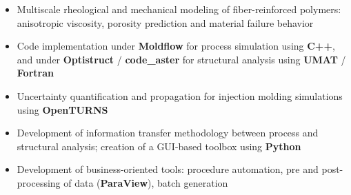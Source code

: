 \documentclass[10pt,a4paper]{altacv}
\begin{document}

\pagestyle{fancy}
\fancyheadoffset{8cm}
\fancyhf{}
\renewcommand{\headrulewidth}{0pt}

\begin{fullwidth}
\makecvheader
\end{fullwidth}



\begin{itemize}
\item Multiscale rheological and mechanical modeling of fiber-reinforced polymers: anisotropic viscosity, porosity prediction and material failure behavior
\item Code implementation under \textbf{Moldflow} for process simulation using \textbf{C++}, and under \textbf{Optistruct} / \textbf{code\_aster} for structural analysis using \textbf{UMAT} / \textbf{Fortran}
\item Uncertainty quantification and propagation for injection molding simulations using \textbf{OpenTURNS}
\item Development of information transfer methodology between process and structural analysis; creation of a GUI-based toolbox using \textbf{Python}
\item Development of business-oriented tools: procedure automation, pre and post-processing of data (\textbf{ParaView}), batch generation
\end{itemize}
\end{document}
